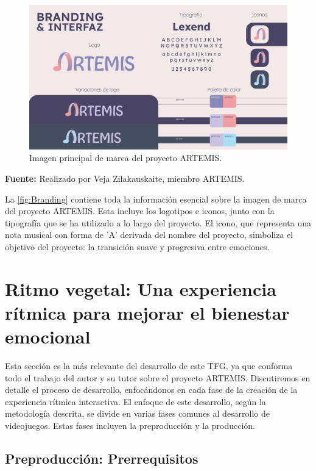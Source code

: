 \begin{figure}[h!]
	\centering
	\includegraphics[width=\linewidth]{Figuras/Desarrollo/Branding.png}
	\caption{Imagen principal de marca del proyecto ARTEMIS.}
	\label{fig:Branding}
	\vspace{-26pt}
\end{figure}

\begin{center}
	\textbf{Fuente:} Realizado por Veja Zilakauskaite, miembro ARTEMIS.	
\end{center}

La \autoref{fig:Branding} contiene toda la información esencial sobre la imagen de marca del proyecto ARTEMIS. Esta incluye los logotipos e iconos, junto con la tipografía que se ha utilizado a lo largo del proyecto. El icono, que representa una nota musical con forma de 'A' derivada del nombre del proyecto, simboliza el objetivo del proyecto: la transición suave y progresiva entre emociones.

\section{Ritmo vegetal: Una experiencia rítmica para mejorar el bienestar emocional}

Esta sección es la más relevante del desarrollo de este TFG, ya que conforma todo el trabajo del autor y su tutor sobre el proyecto ARTEMIS. Discutiremos en detalle el proceso de desarrollo, enfocándonos en cada fase de la creación de la experiencia rítmica interactiva. El enfoque de este desarrollo, según la metodología descrita, se divide en varias fases comunes al desarrollo de videojuegos. Estas fases incluyen la preproducción y la producción. 

\subsection{Preproducción: Prerrequisitos}

